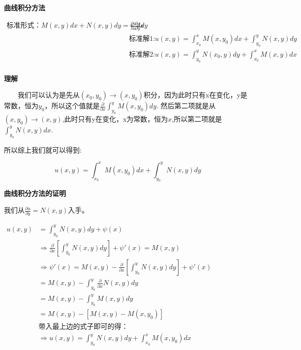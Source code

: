 \documentclass[fontset=windows]{article}
\begin{document}
    \textbf{曲线积分方法}

    \begin{tcolorbox}[colback=blue!5!white,colframe=blue!75!black,title=曲线积分法]
    $
        \begin{aligned}
            \text{标准形式：}M(x,y)dx+N(x,y)dy=\frac{\partial u}{\partial x}dx&+\frac{\partial u}{\partial y}dy\\
            &\text{标准解1:}u(x,y)=\int_{x_0}^{x}{M(x,y_0) dx} + \int_{y_0}^{y}{N(x,y) dy}\\
            &\text{标准解2:}u(x,y)=\int_{y_0}^{y}{N(x_0,y) dy} + \int_{x_0}^{x}{M(x,y) dx}\\
        \end{aligned}
    $ 

    \textbf{理解}


    ~~~~我们可以认为是先从$(x_0, y_0)\to(x, y_0)$积分，因为此时只有x在变化，y是常数，恒为$y_0$，所以这个值就是$\frac{\partial }{\partial x}\int_{y_0}^{y}{M(x,y_0) dy}$.
    然后第二项就是从$(x, y_0)\to (x, y)$,此时只有y在变化，x为常数，恒为$x$,所以第二项就是$\int_{y_0}^{y}{N(x, y) dx}$.

    所以综上我们就可以得到:

    \[
        u(x,y)=\int_{x_0}^{x}{M(x,y_0) dx} + \int_{y_0}^{y}{N(x,y) dy}\nonumber
    \]
    \end{tcolorbox}

    \textbf{曲线积分方法的证明}

    我们从$\frac{\partial u}{\partial y}=N(x,y)$入手。

    $
        \begin{aligned}
            u(x,y)&=\int_{y_0}^{y}{N(x,y) dy}+\psi(x)\nonumber \\
            &\Longrightarrow \frac{\partial}{\partial x}[\int_{y_0}^{y}{N(x,y) dy}]+\psi'(x)=M(x,y)\nonumber \\
            &\Longrightarrow \psi'(x)=M(x,y)-\frac{\partial}{\partial x}[\int_{y_0}^{y}{N(x,y) dy}]+\psi'(x)\nonumber \\
            &=M(x,y)-\int_{y_0}^{y}{\frac{\partial}{\partial x}N(x,y) dy}\nonumber\\
            &=M(x,y)-\int_{y_0}^{y}{M(x,y) dy}\nonumber\\
            &=M(x, y)-[M(x,y)-M(x,y_0)]\nonumber\\
            &\text{带入最上边的式子即可的得：}\nonumber\\
            &\Longrightarrow u(x,y)=\int_{y_0}^{y}{N(x,y) dy}+\int_{x_0}^{x}{M(x,y_0) dx}
        \end{aligned} 
    $
\end{document}
